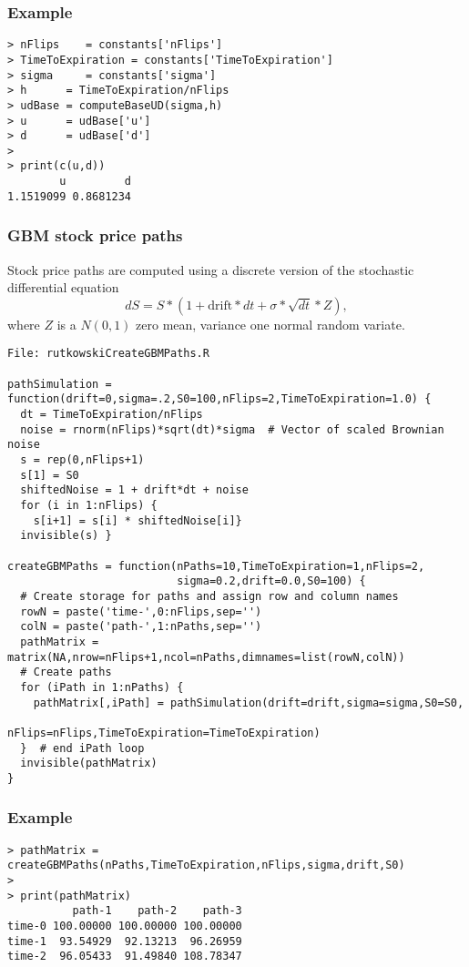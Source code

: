 \documentclass[10pt]{article}
\begin{document}
\subsubsection*{Example}

\begin{verbatim}
> nFlips    = constants['nFlips']
> TimeToExpiration = constants['TimeToExpiration']
> sigma     = constants['sigma']
> h      = TimeToExpiration/nFlips
> udBase = computeBaseUD(sigma,h)
> u      = udBase['u']
> d      = udBase['d']
>
> print(c(u,d))
        u         d
1.1519099 0.8681234
\end{verbatim}


\subsubsection*{GBM stock price paths}

Stock price paths are computed using a discrete version of the stochastic differential equation
$$dS = S * (1 + \text{drift}*dt + \sigma * \sqrt{dt} * Z),$$ where $Z$ is a $N(0,1)$ zero mean, variance one
normal random variate.

\begin{verbatim}
File: rutkowskiCreateGBMPaths.R

pathSimulation = function(drift=0,sigma=.2,S0=100,nFlips=2,TimeToExpiration=1.0) {
  dt = TimeToExpiration/nFlips
  noise = rnorm(nFlips)*sqrt(dt)*sigma  # Vector of scaled Brownian noise
  s = rep(0,nFlips+1)
  s[1] = S0
  shiftedNoise = 1 + drift*dt + noise
  for (i in 1:nFlips) {
    s[i+1] = s[i] * shiftedNoise[i]}
  invisible(s) }

createGBMPaths = function(nPaths=10,TimeToExpiration=1,nFlips=2,
                          sigma=0.2,drift=0.0,S0=100) {
  # Create storage for paths and assign row and column names
  rowN = paste('time-',0:nFlips,sep='')
  colN = paste('path-',1:nPaths,sep='')
  pathMatrix = matrix(NA,nrow=nFlips+1,ncol=nPaths,dimnames=list(rowN,colN))
  # Create paths
  for (iPath in 1:nPaths) {
    pathMatrix[,iPath] = pathSimulation(drift=drift,sigma=sigma,S0=S0,
                                nFlips=nFlips,TimeToExpiration=TimeToExpiration)
  }  # end iPath loop
  invisible(pathMatrix)
}
\end{verbatim}

\subsubsection*{Example}

\begin{verbatim}
> pathMatrix = createGBMPaths(nPaths,TimeToExpiration,nFlips,sigma,drift,S0)
>
> print(pathMatrix)
          path-1    path-2    path-3
time-0 100.00000 100.00000 100.00000
time-1  93.54929  92.13213  96.26959
time-2  96.05433  91.49840 108.78347
\end{verbatim}
\end{document}
